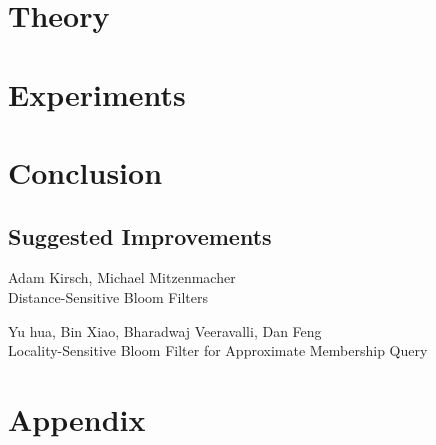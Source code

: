 \documentclass[a4paper,11pt]{article}
\begin{document}
\section{Theory} %




\section{Experiments}



\section{Conclusion}
\subsection{Suggested Improvements}

\newpage

\begin{thebibliography}{}

Adam Kirsch, Michael Mitzenmacher\\
Distance-Sensitive Bloom Filters

Yu hua, Bin Xiao, Bharadwaj Veeravalli, Dan Feng\\
Locality-Sensitive Bloom Filter for Approximate Membership Query

\end{thebibliography}

\section*{Appendix}
%
\end{document}
